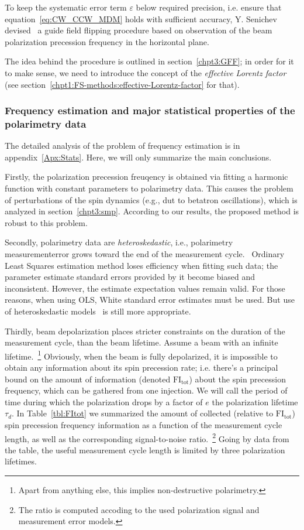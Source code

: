 To keep the systematic error term $\varepsilon$ below required precision, i.e. ensure
that equation~\eqref{eq:CW_CCW_MDM} holds with sufficient accuracy, Y. Senichev 
devised~\cite{Senichev:FDM} a guide field flipping procedure
based on observation of the beam polarization precession frequency in the horizontal plane.

The idea behind the procedure is outlined in section~\ref{chpt3:GFF}; in order for it to make sense, we need
to introduce the concept of the \emph{effective Lorentz factor}
(see section~\ref{chpt1:FS-methods:effective-Lorentz-factor} for that).

\subsubsection{Frequency estimation and major statistical properties of the polarimetry data}
The detailed analysis of the problem of frequency estimation is in appendix~\ref{Apx:Stats}. Here, we will
only summarize the main conclusions.

Firstly, the polarization precession freuqency is obtained via fitting a harmonic function with constant parameters to polarimetry data. This causes the problem of perturbations of the spin dynamics (e.g.,
dut to betatron oscillations), which is analyzed in section~\ref{chpt3:smp}. According to our results,
the proposed method is robust to this problem.

Secondly, polarimetry data are \emph{heteroskedastic}, i.e., polarimetry measurementerror grows
toward the end of the measurement cycle.~\cite{Eversmann:Thesis} Ordinary Least Squares estimation method
loses efficiency when fitting such data; the parameter estimate standard errors provided by it
become biased and inconsistent. However, the estimate expectation values remain valid. For those reasons, when
using OLS, White standard error estimates must be used.
But use of heteroskedastic models~\cite{Stats:R:NLREG, Stats:HeteroskedasticNRM} is still more appropriate.

Thirdly, beam depolarization places stricter constraints on the duration of the measurement cycle, than
the beam lifetime. Assume a beam with an infinite lifetime.~\footnote{Apart from anything else,
  this implies non-destructive polarimetry.} Obviously, when the beam is fully depolarized, it is impossible to
obtain any information about its spin precession rate; i.e. there's a principal bound on the amount of information
(denoted $\mathrm{FI_{tot}}$) about the spin precession frequency, which can be gathered from one injection.
We will call the period of time during which the polarization drops by a factor of $e$
the polarization lifetime $\tau_d$. In Table~\ref{tbl:FItot} we summarized the amount of collected
(relative to $\mathrm{FI_{tot}}$) spin precession frequency information as a function of the measurement cycle
length, as well as the corresponding signal-to-noise ratio.~\footnote{The ratio is computed accoding to
  the used polarization signal and measurement error models.} Going by data from the table, the useful
measurement cycle length is limited by three polarization lifetimes.


